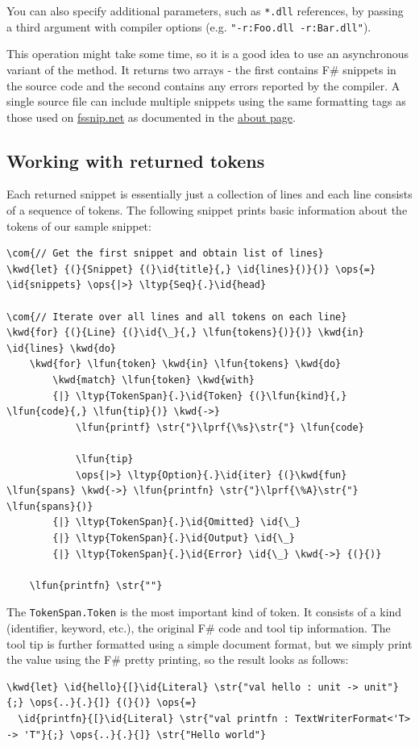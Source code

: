 \documentclass{article}
\newcommand{\id}[1]{\textcolor{black}{#1}}
\newcommand{\com}[1]{\textcolor{officegreen}{#1}}
\newcommand{\kwd}[1]{\textcolor{navy}{#1}}
\newcommand{\ops}[1]{\textcolor{purple}{#1}}
\newcommand{\str}[1]{\textcolor{olive}{#1}}
\begin{document}
You can also specify additional parameters, such as \texttt{*.dll} references, by passing
a third argument with compiler options (e.g. \texttt{"-r:Foo.dll -r:Bar.dll"}).


This operation might take some time, so it is a good idea to use an asynchronous
variant of the method. It returns two arrays - the first contains F\# snippets
in the source code and the second contains any errors reported by the compiler.
A single source file can include multiple snippets using the same formatting tags
as those used on \href{http://www.fssnip.net}{fssnip.net} as documented in the
\href{http://www.fssnip.net/pages/About}{about page}.
\subsection*{Working with returned tokens}



Each returned snippet is essentially just a collection of lines and each line
consists of a sequence of tokens. The following snippet prints basic information
about the tokens of our sample snippet:
\begin{Verbatim}[commandchars=\\\{\}]
\com{// Get the first snippet and obtain list of lines}
\kwd{let} {(}{Snippet} {(}\id{title}{,} \id{lines}{)}{)} \ops{=} \id{snippets} \ops{|>} \ltyp{Seq}{.}\id{head}

\com{// Iterate over all lines and all tokens on each line}
\kwd{for} {(}{Line} {(}\id{\_}{,} \lfun{tokens}{)}{)} \kwd{in} \id{lines} \kwd{do}
    \kwd{for} \lfun{token} \kwd{in} \lfun{tokens} \kwd{do}
        \kwd{match} \lfun{token} \kwd{with}
        {|} \ltyp{TokenSpan}{.}\id{Token} {(}\lfun{kind}{,} \lfun{code}{,} \lfun{tip}{)} \kwd{->}
            \lfun{printf} \str{"}\lprf{\%s}\str{"} \lfun{code}

            \lfun{tip}
            \ops{|>} \ltyp{Option}{.}\id{iter} {(}\kwd{fun} \lfun{spans} \kwd{->} \lfun{printfn} \str{"}\lprf{\%A}\str{"} \lfun{spans}{)}
        {|} \ltyp{TokenSpan}{.}\id{Omitted} \id{\_}
        {|} \ltyp{TokenSpan}{.}\id{Output} \id{\_}
        {|} \ltyp{TokenSpan}{.}\id{Error} \id{\_} \kwd{->} {(}{)}

    \lfun{printfn} \str{""}
\end{Verbatim}



The \texttt{TokenSpan.Token} is the most important kind of token. It consists of a kind
(identifier, keyword, etc.), the original F\# code and tool tip information.
The tool tip is further formatted using a simple document format, but we simply
print the value using the F\# pretty printing, so the result looks as follows:
\begin{Verbatim}[commandchars=\\\{\}]
\kwd{let} \id{hello}{[}\id{Literal} \str{"val hello : unit -> unit"}{;} \ops{..}{.}{]} {(}{)} \ops{=}
  \id{printfn}{[}\id{Literal} \str{"val printfn : TextWriterFormat<'T> -> 'T"}{;} \ops{..}{.}{]} \str{"Hello world"}

\end{Verbatim}
\end{document}
